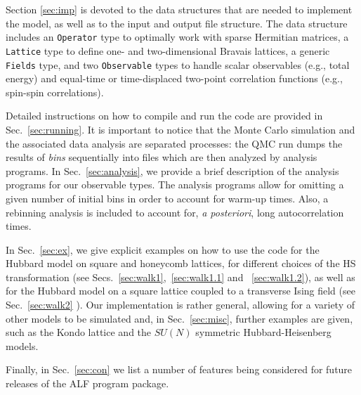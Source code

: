 Section \ref{sec:imp} is devoted to the data structures that are needed to implement the model, as well as to the input and output file structure.   
The data structure includes an \texttt{Operator} type to optimally work with sparse Hermitian matrices, a \texttt{Lattice} type  to define one- and two-dimensional Bravais lattices, a generic \texttt{Fields} type, and two \texttt{Observable} types to handle scalar observables (e.g., total energy) and equal-time or time-displaced two-point correlation functions (e.g., spin-spin correlations).

Detailed instructions on how to compile and run the code are provided in Sec.~\ref{sec:running}.
It is important to notice that the Monte Carlo simulation and the associated data analysis are separated processes: the QMC run dumps the results of \emph{bins} sequentially into files which are then analyzed by analysis programs. In Sec.~\ref{sec:analysis}, we provide a brief description of the analysis programs for our observable types. The analysis programs allow for omitting a given number of initial bins in order to account for warm-up times. Also, a rebinning analysis is included  to account for, \emph{a posteriori}, long autocorrelation times.

In Sec.~\ref{sec:ex}, we give explicit examples on how to use the code for  the  Hubbard model on square and honeycomb lattices,  for different choices of the HS transformation  (see Secs.~\ref{sec:walk1},~\ref{sec:walk1.1} and ~\ref{sec:walk1.2}), as well as for the Hubbard model on a square lattice coupled to a transverse Ising field (see Sec.~\ref{sec:walk2} ).   Our implementation is rather general, allowing for a variety of other models to be simulated and, in Sec.~\ref{sec:misc}, further examples are given, such as the Kondo lattice and the $SU(N)$ symmetric Hubbard-Heisenberg models.

Finally, in Sec.~\ref{sec:con} we list a number of features being considered for  future releases of the ALF program package.
